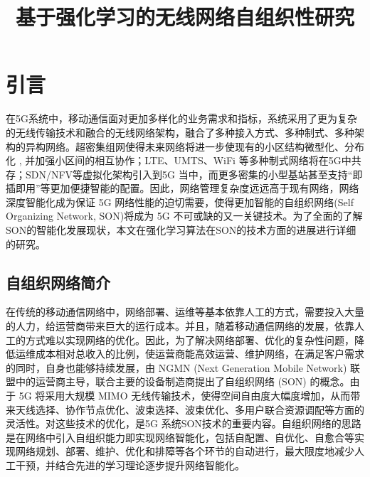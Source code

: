 \documentclass{IEEEtran}
\begin{document}
\title{基于强化学习的无线网络自组织性研究}

\maketitle

%

\section{引言}
在5G系统中，移动通信面对更加多样化的业务需求和指标，系统采用了更为复杂的无线传输技术和融合的无线网络架构，融合了多种接入方式、多种制式、多种架构的异构网络。超密集组网使得未来网络将进一步使现有的小区结构微型化、分布化 , 并加强小区间的相互协作；LTE、UMTS、WiFi 等多种制式网络将在5G中共存；SDN/NFV等虚拟化架构引入到5G 当中，而更多密集的小型基站甚至支持“即插即用”等更加便捷智能的配置。因此，网络管理复杂度远远高于现有网络，网络深度智能化成为保证 5G 网络性能的迫切需要，使得更加智能的自组织网络(Self Organizing Network, SON)将成为 5G 不可或缺的又一关键技术。为了全面的了解SON的智能化发展现状，本文在强化学习算法在SON的技术方面的进展进行详细的研究。

\subsection{自组织网络简介}


在传统的移动通信网络中，网络部署、运维等基本依靠人工的方式，需要投入大量的人力，给运营商带来巨大的运行成本。并且，随着移动通信网络的发展，依靠人工的方式难以实现网络的优化。因此，为了解决网络部署、优化的复杂性问题，降低运维成本相对总收入的比例，使运营商能高效运营、维护网络，在满足客户需求的同时，自身也能够持续发展，由 NGMN (Next Generation Mobile Network) 联盟中的运营商主导，联合主要的设备制造商提出了自组织网络 (SON) 的概念\cite{Alliance2008}。由于 5G 将采用大规模 MIMO 无线传输技术，使得空间自由度大幅度增加，从而带来天线选择、协作节点优化、波束选择、波束优化、多用户联合资源调配等方面的灵活性。对这些技术的优化，是5G 系统SON技术的重要内容。自组织网络的思路是在网络中引入自组织能力即实现网络智能化，包括自配置、自优化、自愈合等实现网络规划、部署、维护、优化和排障等各个环节的自动进行，最大限度地减少人工干预，并结合先进的学习理论逐步提升网络智能化。
\end{document}
